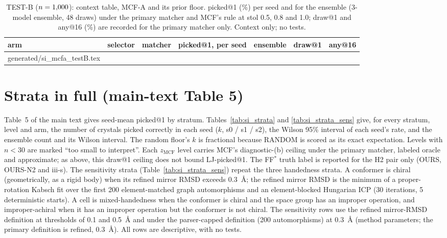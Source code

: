 \documentclass[journal=acsodf,manuscript=article]{achemso}
\makeatletter
\newcommand{\inputrows}[1]{\@@input #1 }
\makeatother
\begin{document}
\begin{table}[htbp]
\caption{TEST-B ($n=1{,}000$): context table, MCF-A and its prior floor. picked@1 (\%) per seed
and for the ensemble (3-model ensemble, 48 draws) under the primary matcher and MCF's rule at
stol 0.5, 0.8 and 1.0; draw@1 and any@16 (\%) are recorded for the primary matcher only.
Context only; no tests.}
\label{tab:si_mcfa}
\centering
\footnotesize
\setlength{\tabcolsep}{3pt}
\begin{tabular}{@{}lllcccc@{}}
\toprule
arm & selector & matcher & picked@1, per seed & ensemble & draw@1 & any@16 \\
\midrule
\inputrows{generated/si_mcfa_testB.tex}
\bottomrule
\end{tabular}
\end{table}

\clearpage
\section{Strata in full (main-text Table 5)}\label{si:strata}
Table~5 of the main text gives seed-mean picked@1 by stratum. Tables~\ref{tab:si_strata} and
\ref{tab:si_strata_sens} give, for every stratum, level and arm, the number of crystals picked
correctly in each seed ($k$, s0 / s1 / s2), the Wilson 95\% interval of each seed's rate, and the
ensemble count and its Wilson interval. The random floor's $k$ is fractional because RANDOM is
scored as its exact expectation. Levels with $n<30$ are marked ``too small to interpret''. Each
$z_\mathrm{MCF}$ level carries MCF's diagnostic-(b) ceiling under the primary matcher, labeled
oracle and approximate; as above, this draw@1 ceiling does not bound LJ-picked@1. The FF$^\ast$
truth label is reported for the H2 pair only (OURS, OURS-N2 and iii-s). The sensitivity strata
(Table~\ref{tab:si_strata_sens}) repeat the three handedness strata. A conformer is chiral
(geometrically, as a rigid body) when its refined mirror RMSD exceeds 0.3~\AA; the refined
mirror RMSD is the minimum of a proper-rotation Kabsch fit over the first 200
element-matched graph automorphisms and an element-blocked Hungarian ICP (30 iterations, 5
deterministic starts). A cell is mixed-handedness when the conformer is chiral and the space
group has an improper operation, and improper-achiral when it has an improper operation but
the conformer is not chiral. The sensitivity rows use the refined mirror-RMSD
definition at thresholds of 0.1 and 0.5~\AA{} and under the parser-capped definition (200
automorphisms) at 0.3~\AA{} (method parameters; the primary definition is refined, 0.3~\AA).
All rows are descriptive, with no tests.
\end{document}

